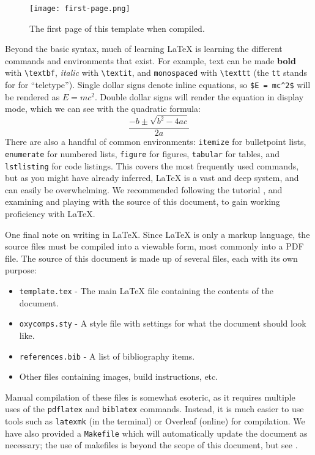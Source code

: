 \documentclass[10pt,twocolumn]{article}
\begin{document}
\begin{figure}
    \centering
    \texttt{[image: first-page.png]}
    \caption{
        The first page of this template when compiled.
    }
    \label{structures}
\end{figure}

Beyond the basic syntax, much of learning LaTeX is learning the different commands and environments that exist.
For example, text can be made \textbf{bold} with \texttt{\textbackslash textbf}, \textit{italic} with \texttt{\textbackslash textit}, and \texttt{monospaced} with \texttt{\textbackslash texttt} (the \texttt{tt} stands for for ``teletype'').
Single dollar signs denote inline equations, so \texttt{\$E = mc\textasciicircum 2\$} will be rendered as $E = mc^2$.
Double dollar signs will render the equation in display mode, which we can see with the quadratic formula:
$$\frac{{-b \pm \sqrt {b^2 - 4ac} }}{{2a}}$$
There are also a handful of common environments: \texttt{itemize} for bulletpoint lists, \texttt{enumerate} for numbered lists, \texttt{figure} for figures, \texttt{tabular} for tables, and \texttt{lstlisting} for code listings.
This covers the most frequently used commands, but as you might have already inferred, LaTeX is a vast and deep system, and can easily be overwhelming.
We recommended following the  tutorial \cite{Overleaf2021LearnLaTeXIn}, and examining and playing with the source of this document, to gain working proficiency with LaTeX.

One final note on writing in LaTeX.
Since LaTeX is only a markup language, the source files must be compiled into a viewable form, most commonly into a PDF file.
The source of this document is made up of several files, each with its own purpose:
\begin{itemize}
    \item \texttt{template.tex} - The main LaTeX file containing the contents of the document.
    \item \texttt{oxycomps.sty} - A style file with settings for what the document should look like.
    \item \texttt{references.bib} - A list of bibliography items.
    \item Other files containing images, build instructions, etc.
\end{itemize}
Manual compilation of these files is somewhat esoteric, as it requires multiple uses of the \texttt{pdflatex} and \texttt{biblatex} commands.
Instead, it is much easier to use tools such as \texttt{latexmk} (in the terminal) or Overleaf (online) for compilation.
We have also provided a \texttt{Makefile} which will automatically update the document as necessary; the use of makefiles is beyond the scope of this document, but see \textcite{Lambert2021MakefileTutorial}.
\end{document}
